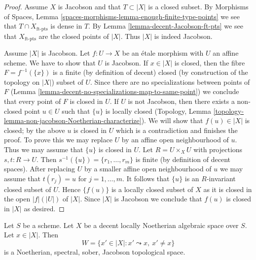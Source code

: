 \begin{proof}
Assume $X$ is Jacobson and that $T \subset |X|$ is a closed subset.
By Morphisms of Spaces, Lemma
\ref{spaces-morphisms-lemma-enough-finite-type-points}
we see that $T \cap X_{\text{ft-pts}}$ is dense in $T$.
By Lemma \ref{lemma-decent-Jacobson-ft-pts} we see that
$X_{\text{ft-pts}}$ are the
closed points of $|X|$. Thus $|X|$ is indeed Jacobson.

\medskip\noindent
Assume $|X|$ is Jacobson. Let $f : U \to X$ be an \'etale
morphism with $U$ an affine scheme. We have to show that $U$
is Jacobson. If $x \in |X|$ is closed,
then the fibre $F = f^{-1}(\{x\})$ is a finite (by definition of
decent) closed (by construction of the topology on $|X|$) subset of $U$.
Since there are no specializations between points of $F$
(Lemma \ref{lemma-decent-no-specializations-map-to-same-point})
we conclude that every point of $F$ is closed in $U$.
If $U$ is not Jacobson, then there exists a non-closed point
$u \in U$ such that $\{u\}$ is locally closed (Topology, Lemma
\ref{topology-lemma-non-jacobson-Noetherian-characterize}).
We will show that $f(u) \in |X|$ is closed; by the above $u$
is closed in $U$ which is a contradiction and finishes
the proof. To prove this we may replace $U$ by an affine open
neighbourhood of $u$.
Thus we may assume that $\{u\}$ is closed in $U$.
Let $R = U \times_X U$ with projections $s, t : R \to U$.
Then $s^{-1}(\{u\}) = \{r_1, \ldots, r_m\}$ is finite (by
definition of decent spaces). After replacing $U$ by a smaller affine
open neighbourhood of $u$ we may assume that $t(r_j) = u$ for
$j = 1, \ldots, m$. It follows that $\{u\}$ is an $R$-invariant
closed subset of $U$. Hence $\{f(u)\}$ is a locally closed subset
of $X$ as it is closed in the open $|f|(|U|)$ of $|X|$. Since $|X|$
is Jacobson we conclude that $f(u)$ is closed in $|X|$ as desired.
\end{proof}

\begin{lemma}
\label{lemma-punctured-spec}
Let $S$ be a scheme. Let $X$ be a decent locally Noetherian algebraic
space over $S$. Let $x \in |X|$. Then
$$
W = \{x' \in |X| : x' \leadsto x,\ x' \not = x\}
$$
is a Noetherian, spectral, sober, Jacobson topological space.
\end{lemma}

